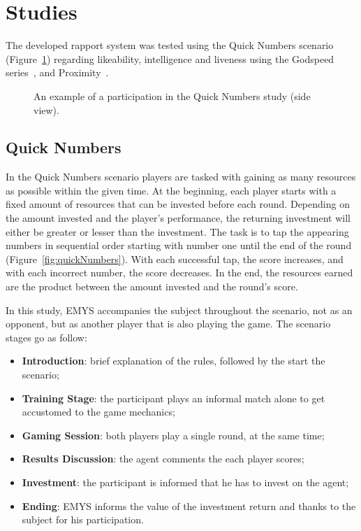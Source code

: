 \section{Studies}
\label{sec:studies}

The developed rapport system was tested using the Quick Numbers scenario (Figure~\ref{fig:quickNumbersScenario}) regarding likeability, intelligence and liveness using the Godspeed series~\cite{bartneck2009measurement, lehmann2015good}, and
	Proximity~\cite{aron1992inclusion}.

\begin{figure}[H]
	\centering
	\caption{An example of a participation in the Quick Numbers study (side view).}
	\label{fig:quickNumbersScenario}
\end{figure}

\subsection{Quick Numbers}

In the Quick Numbers scenario players are tasked with gaining as many resources as possible within the given time. At the beginning, each player starts with a fixed amount of resources that can be invested before each round. Depending on the amount invested and the player's performance, the returning investment will either be greater or lesser than the investment. The task is to tap the appearing numbers in sequential order starting with number one until the end of the round (Figure~\ref{fig:quickNumbers}). With each successful tap, the score increases, and with each incorrect number, the score decreases. In the end, the resources earned are the product between the amount invested and the round's score.

In this study, \ac{EMYS} accompanies the subject throughout the scenario, not as an opponent, but as another player that is also playing the game. The scenario stages go as follow:
\begin{itemize}
	\item \textbf{Introduction}: brief explanation of the rules, followed by the start the scenario;
	\item \textbf{Training Stage}: the participant plays an informal match alone to get accustomed to the game mechanics;
	\item \textbf{Gaming Session}: both players play a single round, at the same time;
	\item \textbf{Results Discussion}: the agent comments the each player scores;
	\item \textbf{Investment}: the participant is informed that he has to invest on the agent;
	\item \textbf{Ending}: \ac{EMYS} informs the value of the investment return and thanks to the subject for his participation.	
\end{itemize}

